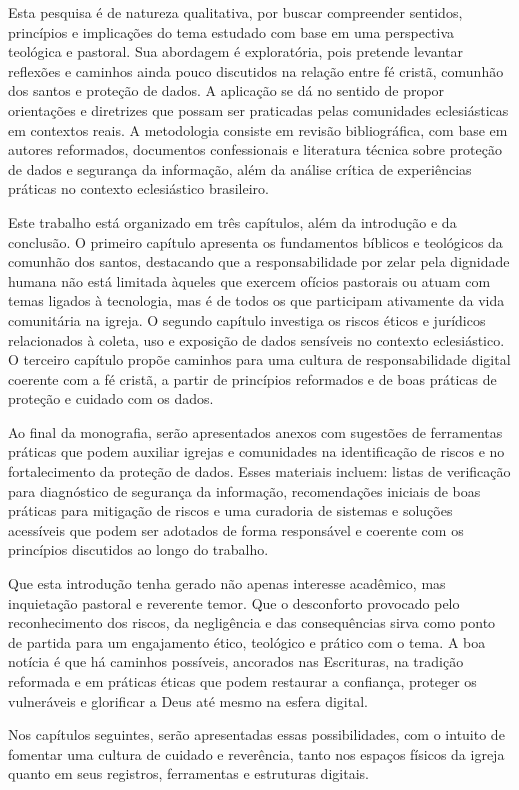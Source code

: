 Esta pesquisa é de natureza qualitativa, por buscar compreender sentidos, princípios e implicações do tema estudado com base em uma perspectiva teológica e pastoral. Sua abordagem é exploratória, pois pretende levantar reflexões e caminhos ainda pouco discutidos na relação entre fé cristã, comunhão dos santos e proteção de dados. A aplicação se dá no sentido de propor orientações e diretrizes que possam ser praticadas pelas comunidades eclesiásticas em contextos reais. A metodologia consiste em revisão bibliográfica, com base em autores reformados, documentos confessionais e literatura técnica sobre proteção de dados e segurança da informação, além da análise crítica de experiências práticas no contexto eclesiástico brasileiro.

Este trabalho está organizado em três capítulos, além da introdução e da conclusão. O primeiro capítulo apresenta os fundamentos bíblicos e teológicos da comunhão dos santos, destacando que a responsabilidade por zelar pela dignidade humana não está limitada àqueles que exercem ofícios pastorais ou atuam com temas ligados à tecnologia, mas é de todos os que participam ativamente da vida comunitária na igreja. O segundo capítulo investiga os riscos éticos e jurídicos relacionados à coleta, uso e exposição de dados sensíveis no contexto eclesiástico. O terceiro capítulo propõe caminhos para uma cultura de responsabilidade digital coerente com a fé cristã, a partir de princípios reformados e de boas práticas de proteção e cuidado com os dados.

Ao final da monografia, serão apresentados anexos com sugestões de ferramentas práticas que podem auxiliar igrejas e comunidades na identificação de riscos e no fortalecimento da proteção de dados. Esses materiais incluem: listas de verificação para diagnóstico de segurança da informação, recomendações iniciais de boas práticas para mitigação de riscos e uma curadoria de sistemas e soluções acessíveis que podem ser adotados de forma responsável e coerente com os princípios discutidos ao longo do trabalho.

Que esta introdução tenha gerado não apenas interesse acadêmico, mas inquietação pastoral e reverente temor. Que o desconforto provocado pelo reconhecimento dos riscos, da negligência e das consequências sirva como ponto de partida para um engajamento ético, teológico e prático com o tema. A boa notícia é que há caminhos possíveis, ancorados nas Escrituras, na tradição reformada e em práticas éticas que podem restaurar a confiança, proteger os vulneráveis e glorificar a Deus até mesmo na esfera digital.

Nos capítulos seguintes, serão apresentadas essas possibilidades, com o intuito de fomentar uma cultura de cuidado e reverência, tanto nos espaços físicos da igreja quanto em seus registros, ferramentas e estruturas digitais.
